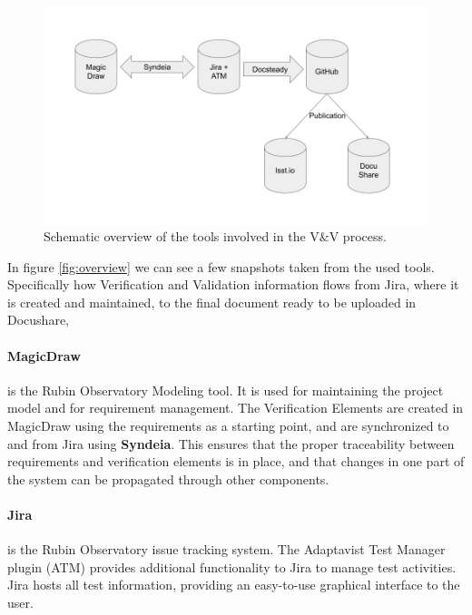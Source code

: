 \begin{figure}
\begin{center}
\includegraphics[width=\textwidth]{imgs/VandVtools.png}
 \caption{Schematic overview of the tools involved in the V\&V process.}
 \label{fig:vandvtools}
\end{center}
\end{figure}

In figure \ref{fig:overview} we can see a few snapshots taken from the used tools.
Specifically how Verification and Validation information flows from Jira, where it is created and maintained,
to the final document ready to be uploaded in Docushare, 


\paragraph{MagicDraw}
is the Rubin Observatory Modeling tool. It is used for maintaining the project model and for requirement management.
The Verification Elements are created in MagicDraw using the requirements as a starting point,
and are synchronized to and from Jira using \textbf{Syndeia}.
This ensures that the proper traceability between requirements and verification elements is in place,
and that changes in one part of the system can be propagated through other components.

\paragraph{Jira}
is the Rubin Observatory issue tracking system.
The Adaptavist Test Manager plugin (ATM) provides additional functionality to Jira to manage test activities.
Jira hosts all test information, providing an easy-to-use graphical interface to the user.

